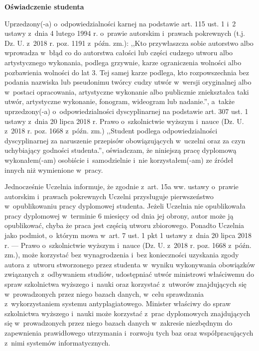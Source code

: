 \begin{center}
    {\bf\large\textsf{Oświadczenie studenta}}
\end{center}


{\sf Uprzedzony(-a) o~odpowiedzialności karnej na podstawie art. 115 ust. 1 i~2 ustawy z~dnia 4 lutego 1994 r. o~prawie autorskim i~prawach pokrewnych (t.j. Dz. U. z~2018 r. poz. 1191 z~późn. zm.): ,,Kto przywłaszcza sobie autorstwo albo wprowadza w~błąd co do autorstwa całości lub części cudzego utworu albo artystycznego wykonania, podlega grzywnie, karze ograniczenia wolności albo pozbawienia wolności do lat 3. Tej samej karze podlega, kto rozpowszechnia bez podania nazwiska lub pseudonimu twórcy cudzy utwór w~wersji oryginalnej albo w~postaci opracowania, artystyczne wykonanie albo publicznie zniekształca taki utwór, artystyczne wykonanie, fonogram, wideogram lub nadanie.'', a~także uprzedzony(-a) o~odpowiedzialności dyscyplinarnej na podstawie art. 307 ust. 1 ustawy z~dnia 20 lipca 2018 r. Prawo o~szkolnictwie wyższym i~nauce (Dz. U. z~2018 r. poz. 1668 z~późn. zm.) ,,Student podlega odpowiedzialności dyscyplinarnej za naruszenie przepisów obowiązujących w~uczelni oraz za czyn uchybiający godności studenta.'', oświadczam, że niniejszą pracę dyplomową wykonałem(-am) osobiście i~samodzielnie i~nie korzystałem(-am) ze źródeł innych niż wymienione w~pracy.

\bigskip

Jednocześnie Uczelnia informuje, że zgodnie z~art. 15a ww. ustawy o~prawie autorskim i~prawach pokrewnych Uczelni przysługuje pierwszeństwo w~opublikowaniu pracy dyplomowej studenta. Jeżeli Uczelnia nie opublikowała pracy dyplomowej w~terminie 6 miesięcy od dnia jej obrony, autor może ją opublikować, chyba że praca jest częścią utworu zbiorowego. Ponadto Uczelnia jako podmiot, o~którym mowa w~art. 7 ust. 1 pkt 1 ustawy z~dnia 20 lipca 2018 r. --- Prawo o~szkolnictwie wyższym i~nauce (Dz. U. z~2018 r. poz. 1668 z~późn. zm.), może korzystać bez wynagrodzenia i~bez konieczności uzyskania zgody autora z~utworu stworzonego przez studenta w~wyniku wykonywania obowiązków związanych z~odbywaniem studiów, udostępniać utwór ministrowi właściwemu do spraw szkolnictwa wyższego i~nauki oraz korzystać z~utworów znajdujących się w~prowadzonych przez niego bazach danych, w~celu sprawdzania z~wykorzystaniem systemu antyplagiatowego. Minister właściwy do spraw szkolnictwa wyższego i~nauki może korzystać z~prac dyplomowych znajdujących się w~prowadzonych przez niego bazach danych w~zakresie niezbędnym do zapewnienia prawidłowego utrzymania i~rozwoju tych baz oraz współpracujących z~nimi systemów informatycznych.}


